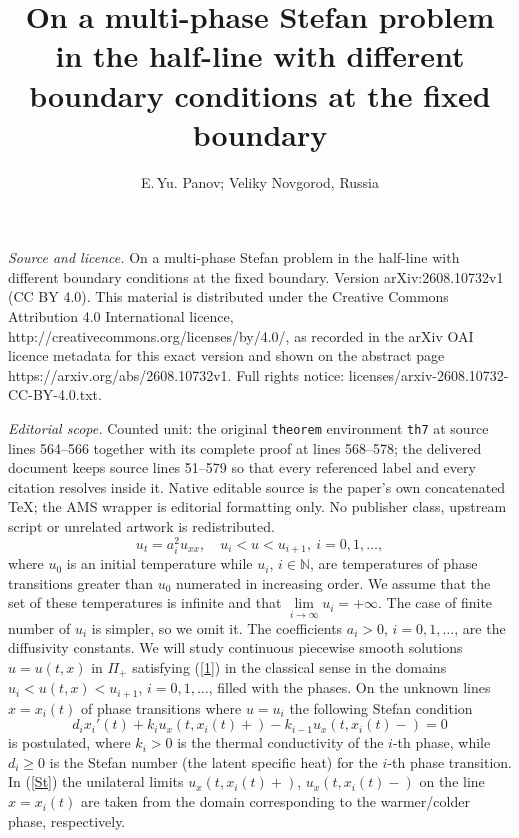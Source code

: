 \documentclass[10pt,a4paper]{amsart}
\numberwithin{equation}{section}
\newcommand{\N}{{\mathbb N}}
\begin{document}
\title[On a multi-phase Stefan problem in the half-line with differ]{On a multi-phase Stefan problem in the half-line with different boundary conditions at the fixed boundary}
\author{E.\,Yu. Panov; Veliky Novgorod, Russia}
\date{}
\maketitle
\noindent\emph{Source and licence.} On a multi-phase Stefan problem in the half-line with different boundary conditions at the fixed boundary. Version arXiv:2608.10732v1 (CC BY 4.0). This material is distributed under the Creative Commons Attribution 4.0 International licence, http://creativecommons.org/licenses/by/4.0/, as recorded in the arXiv OAI licence metadata for this exact version and shown on the abstract page https://arxiv.org/abs/2608.10732v1. Full rights notice: licenses/arxiv-2608.10732-CC-BY-4.0.txt.\par\smallskip
\noindent\textit{Editorial scope.} Counted unit: the original \texttt{theorem} environment \texttt{th7} at source lines 564--566 together with its complete proof at lines 568--578; the delivered document keeps source lines 51--579 so that every referenced label and every citation resolves inside it. Native editable source is the paper's own concatenated TeX; the AMS wrapper is editorial formatting only. No publisher class, upstream script or unrelated artwork is redistributed.
\begin{equation}\label{1}
u_t=a_i^2u_{xx}, \quad u_i<u<u_{i+1}, \ i=0,1,\ldots,
\end{equation}
where $u_0$ is an initial temperature while $u_i$, $i\in\N$, are temperatures of phase transitions greater than $u_0$ numerated in increasing order. We assume that the set of these temperatures is infinite and that $\lim\limits_{i\to\infty} u_i=+\infty$. The case of finite number of $u_i$ is simpler, so we omit it.
The coefficients $a_i>0$, $i=0,1,\ldots$, are the diffusivity constants. We will study continuous piecewise smooth solutions $u=u(t,x)$ in $\Pi_+$ satisfying (\ref{1}) in the classical sense in the domains $u_i<u(t,x)<u_{i+1}$, $i=0,1,\ldots$, filled with the phases. On the unknown lines $x=x_i(t)$ of phase transitions where $u=u_i$ the following Stefan condition
\begin{equation}\label{St}
d_ix_i'(t)+k_iu_x(t,x_i(t)+)-k_{i-1}u_x(t,x_i(t)-)=0
\end{equation}
is postulated, where $k_i>0$ is the thermal conductivity of the $i$-th phase, while $d_i\ge 0$ is the Stefan number (the latent specific heat) for the $i$-th phase transition. In (\ref{St}) the unilateral limits $u_x(t,x_i(t)+)$, $u_x(t,x_i(t)-)$ on the line $x=x_i(t)$ are taken from the domain corresponding to the warmer/colder phase, respectively. 
\end{document}
